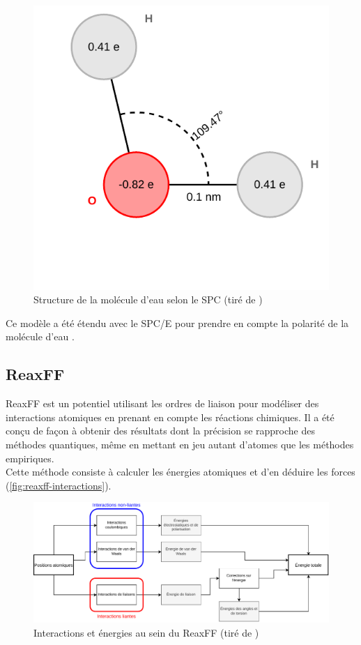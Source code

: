 \documentclass[11pt, a4paper]{article}
\begin{document}
\begin{figure}[hpbt]
	\centering
	\includegraphics[scale=0.6]{H2O-SPCE-structure.pdf}
	\caption{Structure de la molécule d'eau selon le SPC (tiré de \cite{pullman_interaction_1981})}
	\label{fig:spc-structure}
\end{figure}

Ce modèle a été étendu avec le SPC/E pour prendre en compte la polarité de la molécule d'eau \cite{berendsen_missing_1987}.

	\subsection{ReaxFF}

ReaxFF \cite{russo_atomistic-scale_2011}\cite{senftle_reaxff_2016} est un potentiel utilisant les ordres de liaison pour modéliser des interactions atomiques en prenant en compte les réactions chimiques. Il a été conçu de façon à obtenir des résultats dont la précision se rapproche des méthodes quantiques, même en mettant en jeu autant d'atomes que les méthodes empiriques.\\
Cette méthode consiste à calculer les énergies atomiques et d'en déduire les forces (\autoref{fig:reaxff-interactions}).

\begin{figure}[hbpt]
	\centering
	\includegraphics[width=\linewidth]{H2O-ReaxFF-interactions.pdf}
	\caption{Interactions et énergies au sein du ReaxFF (tiré de \cite{russo_atomistic-scale_2011})}
	\label{fig:reaxff-interactions}
\end{figure}
\end{document}
